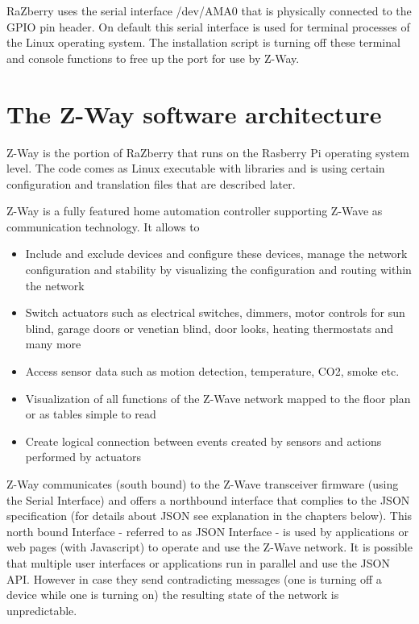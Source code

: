 \documentclass[10pt]{article}
\begin{document}
RaZberry uses the serial interface /dev/AMA0 that is physically connected to the GPIO pin header. On default this serial 
interface is used for terminal processes of the Linux operating system. The 
installation script is turning off these terminal and console functions to free up the port for use by Z-Way.

 
\section{The Z-Way software architecture}

Z-Way is the portion of RaZberry that runs on the Rasberry Pi operating system level. The code comes as Linux executable with 
libraries and is using certain configuration and translation files that are described later.

Z-Way is a fully featured home automation controller supporting Z-Wave as communication technology. It allows to
\begin{itemize}
\item Include and exclude devices and configure these devices, manage the network configuration and stability by visualizing 
the configuration and routing within the network
\item Switch actuators such as electrical switches, dimmers, motor controls for sun blind, garage doors or venetian blind, door 
looks, heating thermostats and many more
\item Access sensor data such as motion detection, temperature, CO2, smoke etc.
\item Visualization of all functions of the Z-Wave network mapped to the floor plan or as tables simple to read
\item Create logical connection between events created by sensors and actions performed by actuators
\end{itemize}

Z-Way communicates (south bound) to the Z-Wave transceiver firmware (using the Serial Interface) and offers a 
northbound interface that complies to the JSON specification (for details about JSON see explanation in the chapters below).
This north bound Interface - referred to as JSON Interface - is used by applications or web pages (with Javascript)
 to operate and use the Z-Wave network. It is possible that multiple user interfaces or applications run in parallel and use the JSON 
 API. However in  case they send contradicting messages (one is turning off a device while one is turning on) the resulting
 state of the network is unpredictable. 
\end{document}
